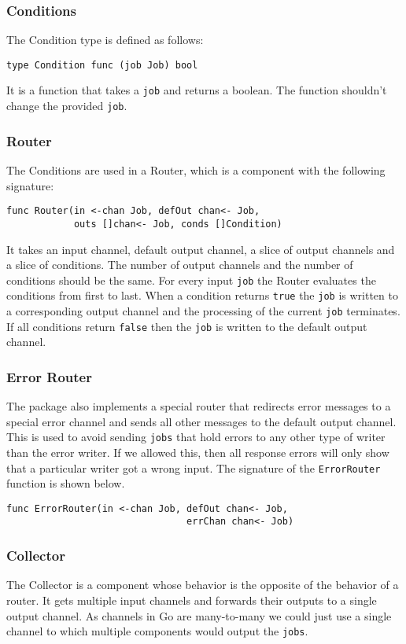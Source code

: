 \subsubsection{Conditions}
The Condition type is defined as follows:
\begin{lstlisting}
type Condition func (job Job) bool
\end{lstlisting}
It is a function that takes a \texttt{job} and returns a boolean.
The function shouldn't change the provided \texttt{job}.

\subsubsection{Router}
The Conditions are used in a Router, which is a component with the 
following signature:
\begin{lstlisting}
func Router(in <-chan Job, defOut chan<- Job, 
            outs []chan<- Job, conds []Condition)
\end{lstlisting}
It takes an input channel, default output channel, a slice of output channels 
and a slice of conditions.
The number of output channels and the number of conditions should be the same.
For every input \texttt{job} the Router evaluates the conditions from first to last.
When a condition returns \texttt{true} the \texttt{job} is written to a 
corresponding output channel 
and the processing of the current \texttt{job} terminates. If all conditions 
return \texttt{false} then the \texttt{job} is written to the default output channel.

\subsubsection{Error Router}
The package also implements a special router that redirects error messages
to a special error channel and sends all other messages to the default output 
channel. This is used to avoid sending \texttt{jobs} that hold errors to 
any other type of writer than the error writer. If we allowed this, then
all response errors will only show that a particular writer got a wrong input.
The signature of the \texttt{ErrorRouter} function is shown below.
\begin{lstlisting}
func ErrorRouter(in <-chan Job, defOut chan<- Job, 
                                errChan chan<- Job)
\end{lstlisting}

\subsubsection{Collector}
The Collector is a component whose behavior is the opposite of the behavior 
of a router. It gets multiple input channels
and forwards their outputs to a single output channel. As channels
in Go are many-to-many we could just use a single channel to which
multiple components would output the \texttt{jobs}. 

